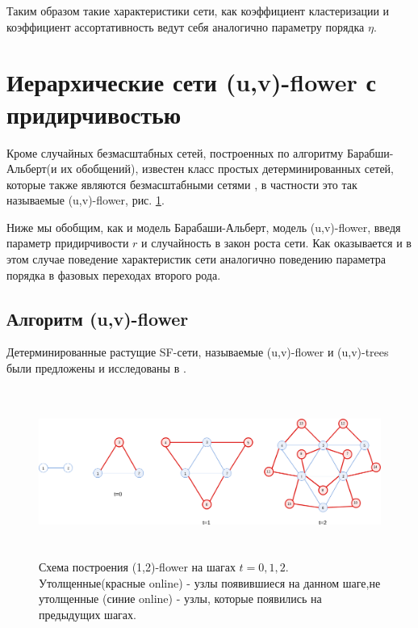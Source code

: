 \documentclass[10pt,aps,pra]{revtex4-1}
\begin{document}
        Таким образом такие характеристики сети, как коэффициент кластеризации и коэффициент ассортативность ведут себя аналогично параметру порядка $\eta$.

\section{Иерархические сети (u,v)-flower с придирчивостью}

    Кроме случайных безмасштабных сетей, построенных по алгоритму Барабши-Альберт(и их обобщений), известен класс простых детерминированных сетей, которые также являются безмасштабными сетями \cite{Rozenfeld2}, в частности это так называемые (u,v)-flower, рис. \ref{fig:flowerGraph}.

    Ниже мы обобщим, как и модель Барабаши-Альберт, модель (u,v)-flower, введя параметр придирчивости $r$ и случайность в закон роста сети. Как оказывается и в этом случае поведение характеристик сети аналогично поведению параметра порядка в фазовых переходах второго рода.

    \subsection{Алгоритм (u,v)-flower}

        Детерминированные растущие SF-сети, называемые (u,v)-flower и (u,v)-trees были предложены и исследованы в \cite{Dor1,Rozenfeld1,Rozenfeld2}.

            \begin{figure}[H]
                \centering
                \includegraphics[height=5.5cm]{graphics/hierarhical.png}
                \caption{
                \label{fig:flowerGraph}
                    Схема построения (1,2)-flower на шагах $t=0,1,2$. Утолщенные(красные online) - узлы появившиеся на данном шаге,не утолщенные (синие online) - узлы, которые появились на предыдущих шагах.}
            \end{figure}
\end{document}
